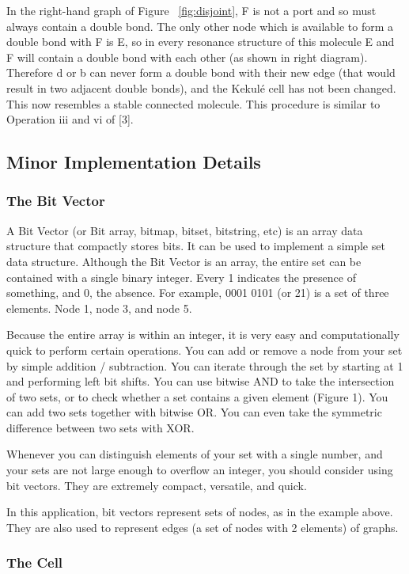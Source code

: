 \documentclass[12pt]{article}
\begin{document}
In the right-hand graph of Figure ~\ref{fig:disjoint}, F is not a port and so must always contain a double bond. The only other node which is available to form a double bond with F is E, so in every resonance structure of this molecule E and F will contain a double bond with each other (as shown in right diagram). Therefore d or b can never form a double bond with their new edge (that would result in two adjacent double bonds), and the Kekul\'e cell has not been changed. This now resembles a stable connected molecule. This procedure is similar to Operation iii and vi of [3].

\subsection{Minor Implementation Details} 

\subsubsection{The Bit Vector}

A Bit Vector (or Bit array, bitmap, bitset, bitstring, etc) is an array data structure that compactly stores bits. It can be used to implement a simple set data structure. Although the Bit Vector is an array, the entire set can be contained with a single binary integer. Every 1 indicates the presence of something, and 0, the absence. For example, 0001 0101 (or 21) is a set of three elements. Node 1, node 3, and node 5. 

Because the entire array is within an integer, it is very easy and computationally quick to perform certain operations. You can add or remove a node from your set by simple addition / subtraction. You can iterate through the set by starting at 1 and performing left bit shifts. You can use bitwise AND to take the intersection of two sets, or to check whether a set contains a given element (Figure 1). You can add two sets together with bitwise OR. You can even take the symmetric difference between two sets with XOR.

Whenever you can distinguish elements of your set with a single number, and your sets are not large enough to overflow an integer, you should consider using bit vectors. They are extremely compact, versatile, and quick.

In this application, bit vectors represent sets of nodes, as in the example above. They are also used to represent edges (a set of nodes with 2 elements) of graphs. 

\subsubsection{The Cell}
\end{document}
